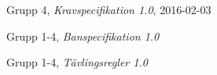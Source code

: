\documentclass[11pt]{article}
\begin{document}
\begin{flushleft}
\setcounter{secnumdepth}{0}
\pagebreak
\begin{thebibliography}{9}

  Grupp 4,
  \emph{Kravspecifikation 1.0},
  2016-02-03
  
	Grupp 1-4,
	\emph{Banspecifikation 1.0}
	
	Grupp 1-4,
	\emph{Tävlingsregler 1.0}

\end{thebibliography}

\setcounter{secnumdepth}{2}

\end{flushleft}
\end{document}
